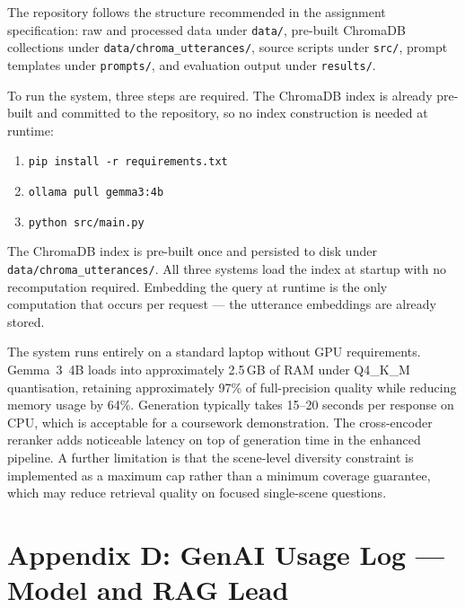 \documentclass[10pt,conference]{IEEEtran}
\begin{document}
The repository follows the structure recommended in the assignment
specification: raw and processed data under \texttt{data/}, pre-built
ChromaDB collections under \texttt{data/chroma\_utterances/}, source
scripts under \texttt{src/}, prompt templates under \texttt{prompts/},
and evaluation output under \texttt{results/}.

To run the system, three steps are required. The ChromaDB index is
already pre-built and committed to the repository, so no index
construction is needed at runtime:

\begin{enumerate}
    \item \texttt{pip install -r requirements.txt}
    \item \texttt{ollama pull gemma3:4b}
    \item \texttt{python src/main.py}
\end{enumerate}

The ChromaDB index is pre-built once and persisted to disk under
\texttt{data/chroma\_utterances/}. All three systems load the index at
startup with no recomputation required. Embedding the query at runtime
is the only computation that occurs per request --- the utterance
embeddings are already stored.

The system runs entirely on a standard laptop without GPU requirements.
Gemma~3~4B loads into approximately 2.5\,GB of RAM under Q4\_K\_M
quantisation, retaining approximately 97\% of full-precision quality
while reducing memory usage by 64\%. Generation typically takes
15--20 seconds per response on CPU, which is acceptable for a coursework
demonstration. The cross-encoder reranker adds noticeable latency on top
of generation time in the enhanced pipeline. A further limitation is that
the scene-level diversity constraint is implemented as a maximum cap
rather than a minimum coverage guarantee, which may reduce retrieval
quality on focused single-scene questions.



\section*{Appendix D: GenAI Usage Log --- Model and RAG Lead}
\end{document}
